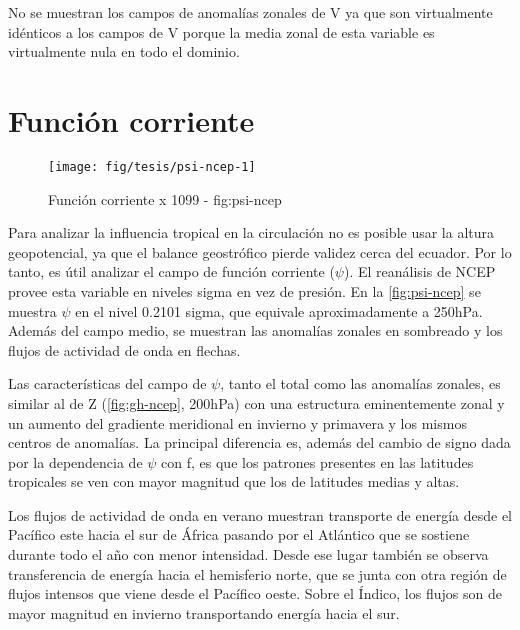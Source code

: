 \documentclass[spanish,a4paper,12p]{book}
\begin{document}
No se muestran los campos de anomalías zonales de V ya que son
virtualmente idénticos a los campos de V porque la media zonal de esta
variable es virtualmente nula en todo el dominio.

\begin{landscape}\end{landscape}

\section{Función corriente}\label{funcion-corriente}

\begin{landscape}\begin{figure}

{\centering \texttt{[image: fig/tesis/psi-ncep-1]} 

}

\caption{Función corriente x 1099 - fig:psi-ncep}\label{fig:psi-ncep}
\end{figure}
\end{landscape}

Para analizar la influencia tropical en la circulación no es posible
usar la altura geopotencial, ya que el balance geostrófico pierde
validez cerca del ecuador. Por lo tanto, es útil analizar el campo de
función corriente (\(\psi\)). El reanálisis de NCEP provee esta variable
en niveles sigma en vez de presión. En la \autoref{fig:psi-ncep} se
muestra \(\psi\) en el nivel 0.2101 sigma, que equivale aproximadamente
a 250hPa. Además del campo medio, se muestran las anomalías zonales en
sombreado y los flujos de actividad de onda en flechas.

Las características del campo de \(\psi\), tanto el total como las
anomalías zonales, es similar al de Z (\autoref{fig:gh-ncep}, 200hPa)
con una estructura eminentemente zonal y un aumento del gradiente
meridional en invierno y primavera y los mismos centros de anomalías. La
principal diferencia es, además del cambio de signo dada por la
dependencia de \(\psi\) con f, es que los patrones presentes en las
latitudes tropicales se ven con mayor magnitud que los de latitudes
medias y altas.

Los flujos de actividad de onda en verano muestran transporte de energía
desde el Pacífico este hacia el sur de África pasando por el Atlántico
que se sostiene durante todo el año con menor intensidad. Desde ese
lugar también se observa transferencia de energía hacia el hemisferio
norte, que se junta con otra región de flujos intensos que viene desde
el Pacífico oeste. Sobre el Índico, los flujos son de mayor magnitud en
invierno transportando energía hacia el sur.
\end{document}
